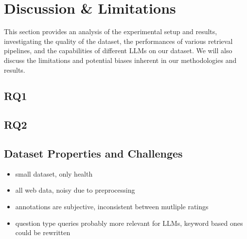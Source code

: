 \chapter{Discussion \& Limitations}\label{discussion}

This section provides an analysis of the experimental setup and results, investigating the quality of the dataset, the performances of various retrieval pipelines, and the capabilities of different LLMs on our dataset.
We will also discuss the limitations and potential biases inherent in our methodologies and results.

\section{RQ1}

\section{RQ2}

\section{Dataset Properties and Challenges}
\begin{itemize}
    \item small dataset, only health
    \item all web data, noisy due to preprocessing
    \item annotations are subjective, inconsistent between mutliple ratings
    \item question type queries probably more relevant for LLMs, keyword based ones could be rewritten
\end{itemize}

